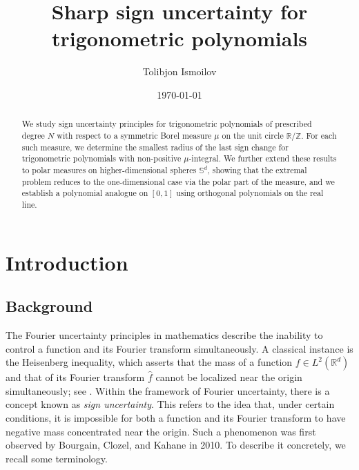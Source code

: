 \documentclass[reqno, a4paper]{amsart}
\title[Sharp sign uncertainty for trigonometric polynomials]{Sharp sign uncertainty for trigonometric polynomials}
\author[Ismoilov]{Tolibjon Ismoilov}
\date{\today}
\def\R{\mathbb{R}}
\def\T{\mathbb{R}/\mathbb{Z}}
\theoremstyle{plain}
\theoremstyle{definition}
\theoremstyle{remarkstyle}
\numberwithin{equation}{section}
\begin{document}
\begin{abstract}
We study sign uncertainty principles for trigonometric polynomials of prescribed degree $N$ with respect to a symmetric Borel measure $\mu$ on the unit circle $\T$. For each such measure, we determine the smallest radius of the last sign change for trigonometric polynomials with non-positive $\mu$-integral. We further extend these results to polar measures on higher-dimensional spheres $\mathbb{S}^d$, showing that the extremal problem reduces to the one-dimensional case via the polar part of the measure, and we establish a polynomial analogue on $[0,1]$ using orthogonal polynomials on the real line. 
\end{abstract}


\maketitle

\section{Introduction}
\subsection{Background} 
The Fourier uncertainty principles in mathematics describe the inability to control a function and its Fourier transform simultaneously. A classical instance is the Heisenberg inequality, which asserts that the mass of a function $f\in L^2(\R^d)$ and that of its Fourier transform $\widehat{f}$ cannot be localized near the origin simultaneously; see \cite{FollandSitaram1997TheUncertaintyPrinciple}. Within the framework of Fourier uncertainty, there is a concept known as \emph{sign uncertainty}. This refers to the idea that, under certain conditions, it is impossible for both a function and its Fourier transform to have negative mass concentrated near the origin. Such a phenomenon was first observed by Bourgain, Clozel, and Kahane \cite{Bourgain2010PrincipeDHeisenbergFonctionsPositives} in 2010. To describe it concretely, we recall some terminology.

\smallskip
\end{document}
